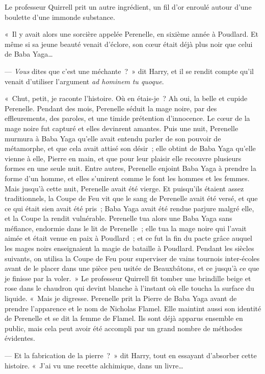 Le professeur Quirrell prit un autre ingrédient, un fil d'or enroulé autour d'une boulette d'une immonde substance.

«~Il y avait alors une sorcière appelée Perenelle, en sixième année à Poudlard. Et même si sa jeune beauté venait d'éclore, son cœur était déjà plus noir que celui de Baba Yaga…

--- \emph{Vous} dites que c'est une méchante~?~» dit Harry, et il se rendit compte qu'il venait d'utiliser l'argument \emph{ad hominem} \emph{tu quoque}.

«~Chut, petit, je raconte l'histoire. Où en étais-je~? Ah oui, la belle et cupide Perenelle. Pendant des mois, Perenelle séduit la mage noire, par des effleurements, des paroles, et une timide prétention d'innocence. Le cœur de la mage noire fut capturé et elles devinrent amantes. Puis une nuit, Perenelle murmura à Baba Yaga qu'elle avait entendu parler de son pouvoir de métamorphe, et que cela avait attisé son désir~; elle obtint de Baba Yaga qu'elle vienne à elle, Pierre en main, et que pour leur plaisir elle recouvre plusieurs formes en une seule nuit. Entre autres, Perenelle enjoint Baba Yaga à prendre la forme d'un homme, et elles s'unirent comme le font les hommes et les femmes. Mais jusqu'à cette nuit, Perenelle avait été vierge. Et puisqu'ils étaient assez traditionnels, la Coupe de Feu vit que le sang de Perenelle avait été versé, et que ce qui était sien avait été pris~; Baba Yaga avait été rendue parjure malgré elle, et la Coupe la rendit vulnérable. Perenelle tua alors une Baba Yaga sans méfiance, endormie dans le lit de Perenelle~; elle tua la mage noire qui l'avait aimée et était venue en paix à Poudlard~; et ce fut la fin du pacte grâce auquel les mages noirs enseignaient la magie de bataille à Poudlard. Pendant les siècles suivants, on utilisa la Coupe de Feu pour superviser de vains tournois inter-écoles avant de le placer dans une pièce peu usitée de Beauxbâtons, et ce jusqu'à ce que je finisse par la voler.~» Le professeur Quirrell fit tomber une brindille beige et rose dans le chaudron qui devint blanche à l'instant où elle toucha la surface du liquide. «~Mais je digresse. Perenelle prit la Pierre de Baba Yaga avant de prendre l'apparence et le nom de Nicholas Flamel. Elle maintint aussi son identité de Perenelle et se dit la femme de Flamel. Ils sont déjà apparus ensemble en public, mais cela peut avoir été accompli par un grand nombre de méthodes évidentes.

--- Et la fabrication de la pierre~?~» dit Harry, tout en essayant d'absorber cette histoire. «~J'ai vu une recette alchimique, dans un livre…

